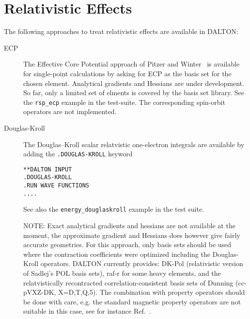 \chapter{\label{chap:Relativity}Relativistic Effects}

The following approaches to treat relativistic effects are available in DALTON:

\begin{description}

\item[ECP]
The Effective Core Potential approach of Pitzer and
Winter~\cite{rmpnmwijqc40} is available for single-point calculations
by asking for ECP as the basis set for the chosen element. Analytical
gradients and Hessians are under development. So far, only a limited
set of elments is covered by the basis set library. See the
\verb|rsp_ecp| example in the test-suite. The corresponding spin-orbit
operators are not implemented.

\begin{center}
\end{center}


\item[Douglas-Kroll] The Douglas--Kroll scalar relatvistic one-electron integrals  
are available by adding the \verb|.DOUGLAS-KROLL|   keyword
\begin{verbatim}
**DALTON INPUT
.DOUGLAS-KROLL
.RUN WAVE FUNCTIONS
....
\end{verbatim}

See also the \verb|energy_douglaskroll| example in the test suite.

  NOTE: Exact analytical gradients and hessians are not available 
at the moment, the approximate gradient and Hessians does however give fairly accurate geometries.  For this approach, only basis sets should be used 
where the contraction coefficients were optimized including the Douglas-Kroll 
operators. DALTON currently provides:  DK-Pol (relativistic version of Sadlej's POL basis sets), raf-r for some heavy elements, and the relatvistically recontracted correlation-consistent basis sets of Dunning (cc-pVXZ-DK, X=D,T,Q,5). The combination with 
property operators should be done with care, e.g. the standard magnetic property
operators are not suitable in this case, see for instance Ref.~\cite{}.


\end{description}
